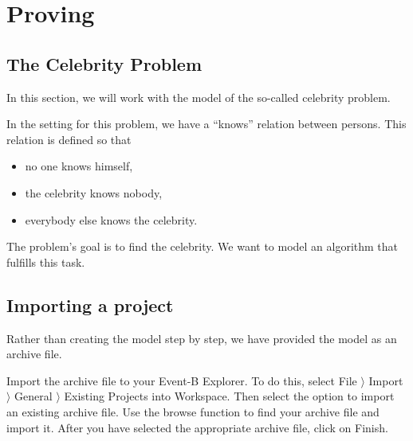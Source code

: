 \section{Proving}
\label{tut_proving}


\subsection{The Celebrity Problem}
\label{tut_celebrity_problem}

In this section, we will work with the model of the so-called celebrity problem.


In the setting for this problem, we have a ``knows'' relation between persons.
This relation is defined so that

\begin{itemize}
	\item no one knows himself,
	\item the celebrity knows nobody,
	\item everybody else knows the celebrity.
\end{itemize}    

The problem's goal is to find the celebrity. We want to model an algorithm that fulfills this task.

\subsection{Importing a project}
\label{tut_import_project}

Rather than creating the model step by step, we have provided the model as an archive file.


Import the archive file  to your Event-B Explorer. To do this, select \textsf{File $\rangle $ Import $\rangle $ General $\rangle $ Existing Projects into Workspace}. Then select the option to import an existing archive file. Use the browse function to find your archive file and import it. After you have selected the appropriate archive file, click on \textsf{Finish}.

